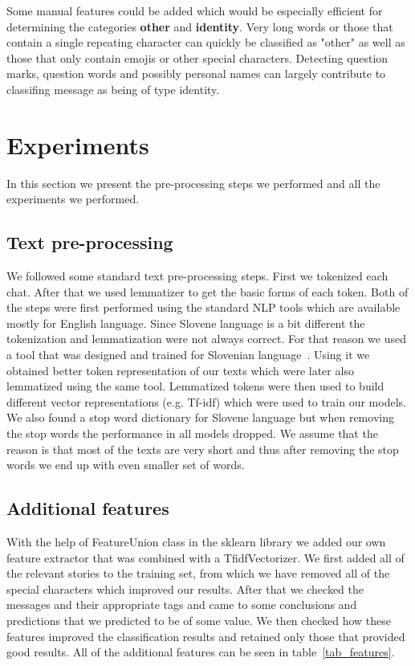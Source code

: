 \documentclass[11pt,a4paper]{article}
\begin{document}
Some manual features could be added which would be especially efficient for determining the categories \textbf{other} and \textbf{identity}.
Very long words or those that contain a single repeating character can quickly be classified as "other" as well as those that only contain emojis or other special characters.
Detecting question marks, question words and possibly personal names can largely contribute to classifing message as being of type identity.

\section{Experiments}
In this section we present the pre-processing steps we performed and all the experiments we performed.

\subsection{Text pre-processing}
We followed some standard text pre-processing steps.
First we tokenized each chat.
After that we used lemmatizer to get the basic forms of each token.
Both of the steps were first performed using the standard NLP tools which are available mostly for English language.
Since Slovene language is a bit different the tokenization and lemmatization were not always correct.
For that reason we used a tool that was designed and trained for Slovenian language~\cite{slotokenizer}.
Using it we obtained better token representation of our texts which were later also lemmatized using the same tool.
Lemmatized tokens were then used to build different vector representations (e.g. Tf-idf) which were used to train our models.
We also found a stop word dictionary for Slovene language but when removing the stop words the performance in all models dropped.
We assume that the reason is that most of the texts are very short and thus after removing the stop words we end up with even smaller set of words.

\subsection{Additional features}

With the help of FeatureUnion class in the sklearn library we added our own feature extractor that was combined with a TfidfVectorizer.
We first added all of the relevant stories to the training set, from which we have removed all of the special characters which improved our results.
After that we checked the messages and their appropriate tags and came to some conclusions and predictions that we predicted to be of some value.
We then checked how these features improved the classification results and retained only those that provided good results.
All of the additional features can be seen in table~\ref{tab_features}.
\end{document}
